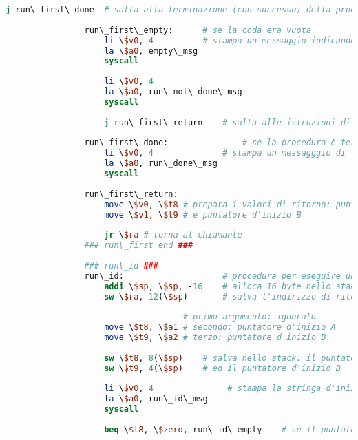 \begin{center}
\begin{lstlisting}[language=mips, gobble=14, stepnumber=1]
                    j run\_first\_done	# salta alla terminazione (con successo) della proocedura run\_first
                        
                run\_first\_empty:		# se la coda era vuota
                    li \$v0, 4			# stampa un messaggio indicando l'errore
                    la \$a0, empty\_msg
                    syscall
                    
                    li \$v0, 4
                    la \$a0, run\_not\_done\_msg
                    syscall
                    
                    j run\_first\_return	# salta alle istruzioni di ritorno
                
                run\_first\_done:				# se la procedura è terminata con successo
                    li \$v0, 4				# stampa un messagggio di terminazione
                    la \$a0, run\_done\_msg
                    syscall
                    
                run\_first\_return:
                    move \$v0, \$t8	# prepara i valori di ritorno: puntatore d'inizio A
                    move \$v1, \$t9	# e puntatore d'inizio B
                
                    jr \$ra	# torna al chiamante
                ### run\_first end ###
                
                ### run\_id ###
                run\_id:					# procedura per eseguire un task specifico
                    addi \$sp, \$sp, -16	# alloca 16 byte nello stack frame (4 word)
                    sw \$ra, 12(\$sp)		# salva l'indirizzo di ritorno nello stack
                
                					# primo argomento: ignorato
                    move \$t8, \$a1	# secondo: puntatore d'inizio A
                    move \$t9, \$a2	# terzo: puntatore d'inizio B
                    
                    sw \$t8, 8(\$sp)	# salva nello stack: il puntatore d'inizio A
                    sw \$t9, 4(\$sp)	# ed il puntatore d'inizio B
                
                    li \$v0, 4               # stampa la stringa d'inizio dell'esecuzione di un task specifico
                    la \$a0, run\_id\_msg
                    syscall
                    
                    beq \$t8, \$zero, run\_id\_empty	# se il puntatore d'inizio è nullo, allora la coda è vuota
                    

\end{lstlisting}
\end{center}
